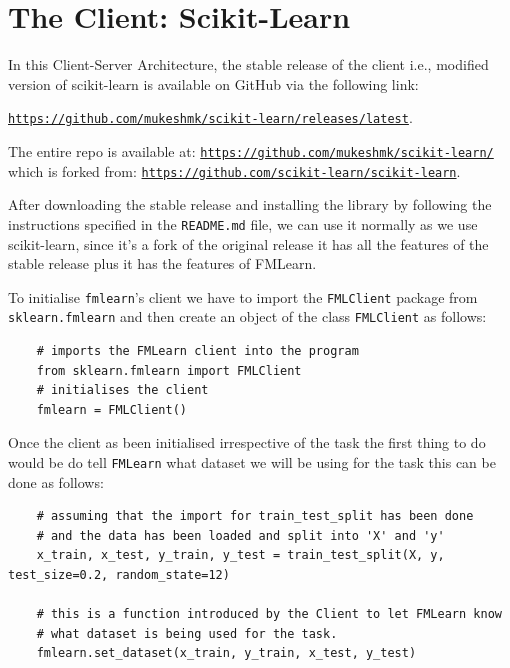 \section{The Client: Scikit-Learn}
\label{scikit-learn}

In this Client-Server Architecture, the stable release of the client i.e., modified version of scikit-learn is available on GitHub via the following link:
\begin{center}
\href{https://github.com/mukeshmk/scikit-learn/releases/latest}
{\texttt{https://github.com/mukeshmk/scikit-learn/releases/latest}}.
\end{center}

The entire repo is available at: \href{https://github.com/mukeshmk/scikit-learn/}{\texttt{https://github.com/mukeshmk/scikit-learn/}} \newline which is forked from: \href{https://github.com/scikit-learn/scikit-learn}{\texttt{https://github.com/scikit-learn/scikit-learn}}.

After downloading the stable release and installing the library by following the instructions specified in the \texttt{README.md} file, we can use it normally as we use scikit-learn, since it's a fork of the original release it has all the features of the stable release plus it has the features of FMLearn.

To initialise \texttt{fmlearn}'s client we have to import the \texttt{FMLClient} package from \texttt{sklearn.fmlearn} and then create an object of the class \texttt{FMLClient} as follows:
\begin{lstlisting}
    # imports the FMLearn client into the program
    from sklearn.fmlearn import FMLClient
    # initialises the client
    fmlearn = FMLClient()
\end{lstlisting}

Once the client as been initialised irrespective of the task the first thing to do would be do tell \texttt{FMLearn} what dataset we will be using for the task this can be done as follows:

\begin{lstlisting}
    # assuming that the import for train_test_split has been done
    # and the data has been loaded and split into 'X' and 'y'
    x_train, x_test, y_train, y_test = train_test_split(X, y, test_size=0.2, random_state=12)

    # this is a function introduced by the Client to let FMLearn know 
    # what dataset is being used for the task.
    fmlearn.set_dataset(x_train, y_train, x_test, y_test)
\end{lstlisting}


